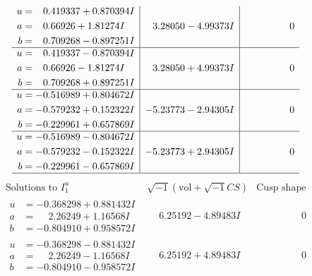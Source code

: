 \documentclass[1p]{elsarticle_modified}
\theoremstyle{definition}
\newcommand{\I}{\sqrt{-1}}
\begin{document}
$$\begin{array}{c|c|c}
\begin{aligned}
u &= \phantom{-}0.419337 + 0.870394 I \\
a &= \phantom{-}0.66926 + 1.81274 I \\
b &= \phantom{-}0.709268 - 0.897251 I\end{aligned}
 & \phantom{-}3.28050 - 4.99373 I & \phantom{-0.000000 } 0 \\ \hline\begin{aligned}
u &= \phantom{-}0.419337 - 0.870394 I \\
a &= \phantom{-}0.66926 - 1.81274 I \\
b &= \phantom{-}0.709268 + 0.897251 I\end{aligned}
 & \phantom{-}3.28050 + 4.99373 I & \phantom{-0.000000 } 0 \\ \hline\begin{aligned}
u &= -0.516989 + 0.804672 I \\
a &= -0.579232 + 0.152322 I \\
b &= -0.229961 + 0.657869 I\end{aligned}
 & -5.23773 - 2.94305 I & \phantom{-0.000000 } 0 \\ \hline\begin{aligned}
u &= -0.516989 - 0.804672 I \\
a &= -0.579232 - 0.152322 I \\
b &= -0.229961 - 0.657869 I\end{aligned}
 & -5.23773 + 2.94305 I & \phantom{-0.000000 } 0\\
 \hline 
 \end{array}$$\newpage$$\begin{array}{c|c|c}  
\text{Solutions to }I^u_{1}& \I (\text{vol} + \sqrt{-1}CS) & \text{Cusp shape}\\
 \hline 
\begin{aligned}
u &= -0.368298 + 0.881432 I \\
a &= \phantom{-}2.26249 + 1.16568 I \\
b &= -0.804910 + 0.958572 I\end{aligned}
 & \phantom{-}6.25192 - 4.89483 I & \phantom{-0.000000 } 0 \\ \hline\begin{aligned}
u &= -0.368298 - 0.881432 I \\
a &= \phantom{-}2.26249 - 1.16568 I \\
b &= -0.804910 - 0.958572 I\end{aligned}
 & \phantom{-}6.25192 + 4.89483 I & \phantom{-0.000000 } 0 \\ \hline\begin{aligned}

\end{aligned}
\end{array}$$
\end{document}
